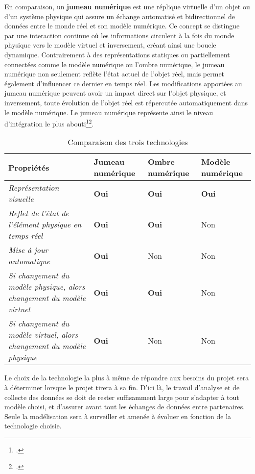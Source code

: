 En comparaison, un \textbf{jumeau numérique} est une réplique virtuelle d’un objet ou d’un système physique qui assure un échange automatisé et bidirectionnel de données entre le monde réel et son modèle numérique. Ce concept se distingue par une interaction continue où les informations circulent à la fois du monde physique vers le modèle virtuel et inversement, créant ainsi une boucle dynamique.  Contrairement à des représentations statiques ou partiellement connectées comme le modèle numérique ou l’ombre numérique, le jumeau numérique non seulement reflète l’état actuel de l’objet réel, mais permet également d’influencer ce dernier en temps réel. Les modifications apportées au jumeau numérique peuvent avoir un impact direct sur l’objet physique, et inversement, toute évolution de l’objet réel est répercutée automatiquement dans le modèle numérique. Le jumeau numérique représente ainsi le niveau d’intégration le plus abouti\footcite{donniniToutComprendreJumeau2023}\footcite{kritzingerDigitalTwinManufacturing2018}.

\begin{table}[ht!]
\centering
\small 
\begin{tabularx}{\textwidth}{|>{\centering\arraybackslash}X|>{\centering\arraybackslash}X|>{\centering\arraybackslash}X|>{\centering\arraybackslash}X|}
\hline
\textbf{Propriétés} & \textbf{Jumeau numérique} & \textbf{Ombre numérique} & \textbf{Modèle numérique} \\
\hline
\emph{Représentation visuelle} & \textbf{Oui} & \textbf{Oui} & \textbf{Oui} \\
\hline
\emph{Reflet de l’état de l’élément physique en temps réel} & \textbf{Oui} & \textbf{Oui} & Non \\
\hline
\emph{Mise à jour automatique} & \textbf{Oui} & Non & Non \\
\hline
\emph{Si changement du modèle physique, alors changement du modèle virtuel} & \textbf{Oui} & \textbf{Oui} & Non \\
\hline
\emph{Si changement du modèle virtuel, alors changement du modèle physique} & \textbf{Oui} & Non & Non \\
\hline
\end{tabularx}
\caption{Comparaison des trois technologies}
\label{tab:Comparaison des trois technologies}
\end{table}

Le choix de la technologie la plus à même de répondre aux besoins du projet sera à déterminer lorsque le projet tirera à sa fin. D’ici là, le travail d’analyse et de collecte des données se doit de rester suffisamment large pour s'adapter à tout modèle choisi, et d'assurer avant tout les échanges de données entre partenaires. Seule la modélisation sera à surveiller et amenée à évoluer en fonction de la technologie choisie.\\

